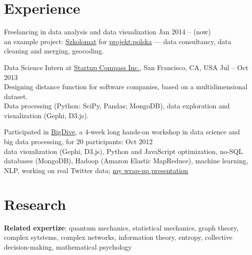 \documentclass[margin,line]{resume}
\begin{document}
\begin{resume}

    \section{\mysidestyle Experience}

    \begin{list2}

    \item Freelancing in data analysis and data visualization  \hfill Jan 2014 -- (now)\\
        an example project: \href{http://szkolomat.pl/}{Szkolomat} for \href{http://projektpolska.pl/english/}{projekt:polska} --- data consultancy, data cleaning and merging, geocoding. 

    \item Data Science Intern at \href{http://compass.co}{Startup Compass Inc.}, San Francisco, CA, USA \hfill Jul -- Oct 2013\\
        Designing distance function for software companies, based on a multidimensional dataset.\\
        Data processing (Python: SciPy, Pandas; MongoDB), data exploration and visualization (Gephi, D3.js).

    \item Participated in \href{http://bigdive.eu}{BigDive}, a 4-week long hands-on workshop in data science and big data processing, for 20 participants: \hfill { Oct 2012}\\
        data visualization (Gephi, D3.js), Python and JavaScript optimization, no-SQL databases (MongoDB), Hadoop (Amazon Elastic MapReduce), machine learning, NLP, working on real Twitter data; \href{https://speakerdeck.com/pmigdal/a-map-of-256-tags-of-stackoverflow-at-bigdive-wrap-up}{my wrap-up presentation} 

    \end{list2}

    \section{\mysidestyle Research}

    \begin{list2}

    \item {\bf Related expertize}: quantum mechanics, statistical mechanics, graph theory, complex sytstems, complex networks, information theory, entropy, collective decision-making, mathematical psychology


\end{list2}
\end{resume}
\end{document}
